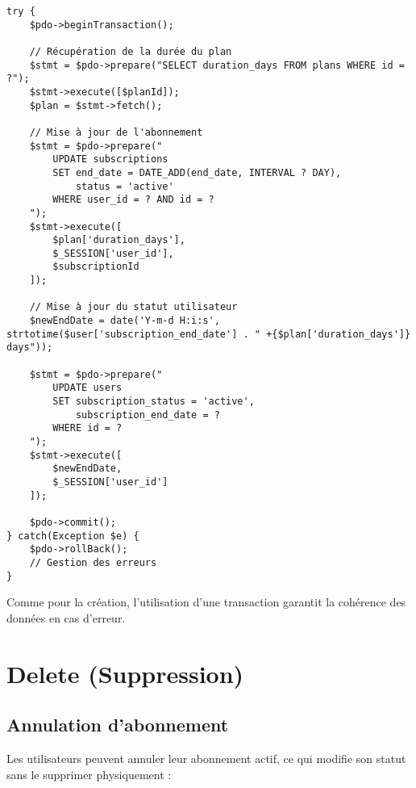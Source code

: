 \documentclass[12pt,a4paper]{report}
\begin{document}
\begin{lstlisting}[style=phpStyle, caption=Extrait de renew\_subscription.php - Renouvellement d'abonnement]
try {
    $pdo->beginTransaction();
    
    // Récupération de la durée du plan
    $stmt = $pdo->prepare("SELECT duration_days FROM plans WHERE id = ?");
    $stmt->execute([$planId]);
    $plan = $stmt->fetch();
    
    // Mise à jour de l'abonnement
    $stmt = $pdo->prepare("
        UPDATE subscriptions 
        SET end_date = DATE_ADD(end_date, INTERVAL ? DAY),
            status = 'active'
        WHERE user_id = ? AND id = ?
    ");
    $stmt->execute([
        $plan['duration_days'],
        $_SESSION['user_id'],
        $subscriptionId
    ]);
    
    // Mise à jour du statut utilisateur
    $newEndDate = date('Y-m-d H:i:s', strtotime($user['subscription_end_date'] . " +{$plan['duration_days']} days"));
    
    $stmt = $pdo->prepare("
        UPDATE users 
        SET subscription_status = 'active',
            subscription_end_date = ?
        WHERE id = ?
    ");
    $stmt->execute([
        $newEndDate,
        $_SESSION['user_id']
    ]);
    
    $pdo->commit();
} catch(Exception $e) {
    $pdo->rollBack();
    // Gestion des erreurs
}
\end{lstlisting}

Comme pour la création, l'utilisation d'une transaction garantit la cohérence des données en cas d'erreur.

\section{Delete (Suppression)}

\subsection{Annulation d'abonnement}
Les utilisateurs peuvent annuler leur abonnement actif, ce qui modifie son statut sans le supprimer physiquement :
\end{document}
